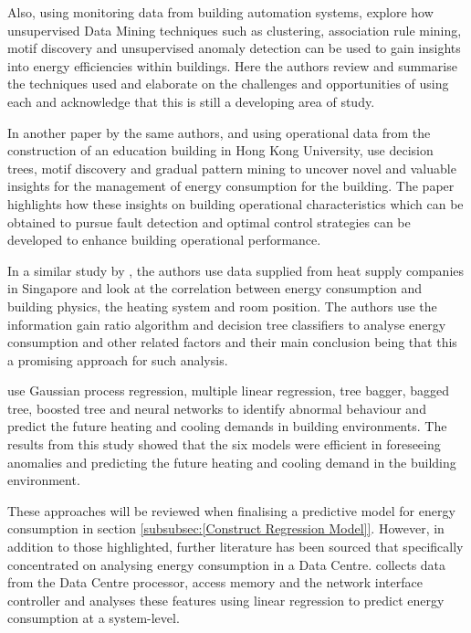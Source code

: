 \documentclass[12pt]{scrartcl}
\begin{document}
Also, using monitoring data from building automation systems, \citet{FAN2018296} explore how unsupervised Data Mining techniques such as clustering, association rule mining, motif discovery and unsupervised anomaly detection can be used to gain insights into energy efficiencies within buildings. Here the authors review and summarise the techniques used and elaborate on the challenges and opportunities of using each and acknowledge that this is still a developing area of study.  

In another paper by the same authors, and using operational data from the construction of an education building in Hong Kong University, \citet{FAN2018296} use decision trees, motif discovery and gradual pattern mining to uncover novel and valuable insights for the management of energy consumption for the building. The paper highlights how these insights on building operational characteristics which can be obtained to pursue fault detection and optimal control strategies can be developed to enhance building operational performance.   

In a similar study by \citet{ZHOU201873}, the authors use data supplied from heat supply companies in Singapore and look at the correlation between energy consumption and building physics, the heating system and room position. The authors use the information gain ratio algorithm and decision tree classifiers to analyse energy consumption and other related factors and their main conclusion being that this a promising approach for such analysis. 

\citet{AHMAD2018460} use Gaussian process regression, multiple linear regression, tree bagger, bagged tree, boosted tree and neural networks to identify abnormal behaviour and predict the future heating and cooling demands in building environments. The results from this study showed that the six models were efficient in foreseeing anomalies and predicting the future heating and cooling demand in the building environment.  

These approaches will be reviewed when finalising a predictive model for energy consumption in section \ref{subsubsec:[Construct Regression Model]}. However, in addition to those highlighted, further literature has been sourced that specifically concentrated on analysing energy consumption in a Data Centre. \citet{Makris2017} collects data from the Data Centre processor, access memory and the network interface controller and analyses these features using linear regression to predict energy consumption at a system-level.
\end{document}
